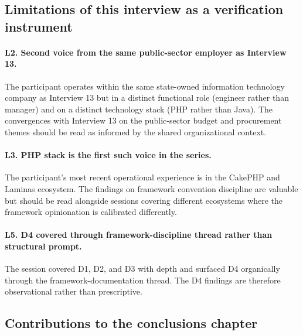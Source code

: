 \subsection*{Limitations of this interview as a verification instrument}

\paragraph*{L2. Second voice from the same public-sector employer as Interview 13.} The participant operates within the same state-owned information technology company as Interview 13 but in a distinct functional role (engineer rather than manager) and on a distinct technology stack (PHP rather than Java). The convergences with Interview 13 on the public-sector budget and procurement themes should be read as informed by the shared organizational context.

\paragraph*{L3. PHP stack is the first such voice in the series.} The participant's most recent operational experience is in the CakePHP and Laminas ecosystem. The findings on framework convention discipline are valuable but should be read alongside sessions covering different ecosystems where the framework opinionation is calibrated differently.

\paragraph*{L5. D4 covered through framework-discipline thread rather than structural prompt.} The session covered D1, D2, and D3 with depth and surfaced D4 organically through the framework-documentation thread. The D4 findings are therefore observational rather than prescriptive.

\subsection*{Contributions to the conclusions chapter}

